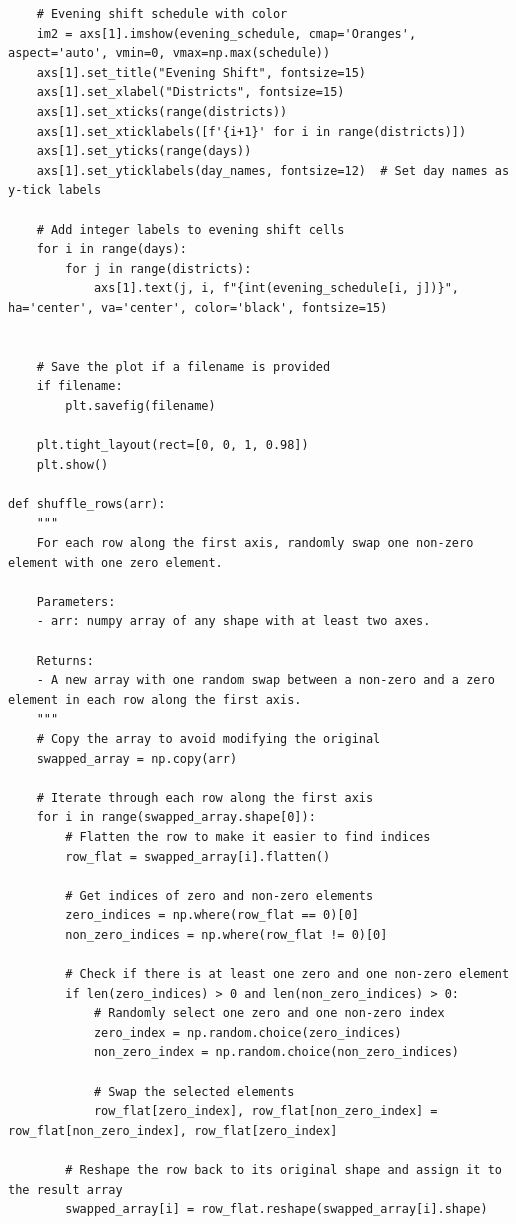 \documentclass{article}
\begin{document}
\begin{verbatim}
    # Evening shift schedule with color
    im2 = axs[1].imshow(evening_schedule, cmap='Oranges', aspect='auto', vmin=0, vmax=np.max(schedule))
    axs[1].set_title("Evening Shift", fontsize=15)
    axs[1].set_xlabel("Districts", fontsize=15)
    axs[1].set_xticks(range(districts))
    axs[1].set_xticklabels([f'{i+1}' for i in range(districts)])
    axs[1].set_yticks(range(days))
    axs[1].set_yticklabels(day_names, fontsize=12)  # Set day names as y-tick labels

    # Add integer labels to evening shift cells
    for i in range(days):
        for j in range(districts):
            axs[1].text(j, i, f"{int(evening_schedule[i, j])}", ha='center', va='center', color='black', fontsize=15)


    # Save the plot if a filename is provided
    if filename:
        plt.savefig(filename)

    plt.tight_layout(rect=[0, 0, 1, 0.98])
    plt.show()

def shuffle_rows(arr):
    """
    For each row along the first axis, randomly swap one non-zero element with one zero element.
    
    Parameters:
    - arr: numpy array of any shape with at least two axes.
    
    Returns:
    - A new array with one random swap between a non-zero and a zero element in each row along the first axis.
    """
    # Copy the array to avoid modifying the original
    swapped_array = np.copy(arr)
    
    # Iterate through each row along the first axis
    for i in range(swapped_array.shape[0]):
        # Flatten the row to make it easier to find indices
        row_flat = swapped_array[i].flatten()
        
        # Get indices of zero and non-zero elements
        zero_indices = np.where(row_flat == 0)[0]
        non_zero_indices = np.where(row_flat != 0)[0]
        
        # Check if there is at least one zero and one non-zero element
        if len(zero_indices) > 0 and len(non_zero_indices) > 0:
            # Randomly select one zero and one non-zero index
            zero_index = np.random.choice(zero_indices)
            non_zero_index = np.random.choice(non_zero_indices)
            
            # Swap the selected elements
            row_flat[zero_index], row_flat[non_zero_index] = row_flat[non_zero_index], row_flat[zero_index]
        
        # Reshape the row back to its original shape and assign it to the result array
        swapped_array[i] = row_flat.reshape(swapped_array[i].shape)
    

\end{verbatim}
\end{document}
